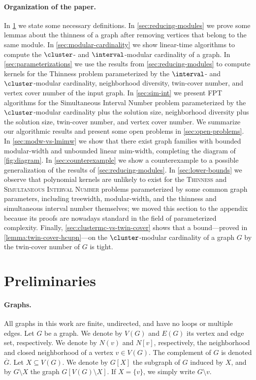 \documentclass[11pt]{article}
\theoremstyle{plain}
\theoremstyle{definition}
\theoremstyle{remark}
\newcommand{\FPT}{{\smaller[0.83]\textsf{\textup{FPT}}}\xspace}
\begin{document}
\paragraph{Organization of the paper.} In \cref{sec:preliminaries} we state some necessary definitions. In \cref{sec:reducing-modules} we prove some lemmas about the thinness of a graph after removing vertices that belong to the same module. In \cref{sec:modular-cardinality} we show linear-time algorithms to compute the $\cluster$- and $\interval$-modular cardinality of a graph. In \cref{sec:parameterizations} we use the results from \cref{sec:reducing-modules} to compute kernels for the {\sc Thinness} problem parameterized by the $\interval$- and $\cluster$-modular cardinality, neighborhood diversity, twin-cover number, and vertex cover number of the input graph.
In \cref{sec:sim-int} we present \FPT algorithms for the {\sc Simultaneous Interval Number} problem parameterized by the $\cluster$-modular cardinality plus the solution size, neighborhood diversity plus the solution size, twin-cover number, and vertex cover number. We summarize our algorithmic results and present some open problems in \cref{sec:open-problems}.
In \cref{sec:modw-vs-lmimw} we show that there exist graph families with bounded modular-width and unbounded linear mim-width, completing the diagram of \cref{fig:diagram}. In \cref{sec:counterexample} we show a counterexample to a possible generalization of the results of \cref{sec:reducing-modules}. In \cref{sec:lower-bounds} we observe that polynomial kernels are unlikely to exist for the \textsc{Thinness} {and \textsc{Simultaneous Interval Number} problems} parameterized by some common graph parameters, including treewidth, modular-width, and the thinness {and simultaneous interval number themselves}; {we moved this section to the appendix because its proofs are nowadays standard in the field of parameterized complexity.} Finally, \cref{sec:clustermc-vs-twin-cover} shows that a bound---proved in \cref{lemma:twin-cover-hcupn}---on the $\cluster$-modular cardinality of a graph $G$ by the twin-cover number of $G$ is tight. 

\section{Preliminaries}
\label{sec:preliminaries}
\paragraph{Graphs.} All graphs in this work are finite, undirected, and have no loops or multiple edges. 
Let $G$ be a graph. We denote by $V(G)$ and $E(G)$ its vertex and edge set, respectively. We denote by $N(v)$ and $N[v]$, respectively,
the neighborhood and closed neighborhood of a vertex $v \in V(G)$. The complement of $G$ is denoted $\overline{G}$.
Let $X \subseteq V(G)$.
We denote by $G[X]$ the subgraph of $G$ induced by $X$, and by $G \setminus X$ the graph $G[V(G) \setminus X]$. If $X = \{v\}$, we simply write $G \setminus v$.
\end{document}
